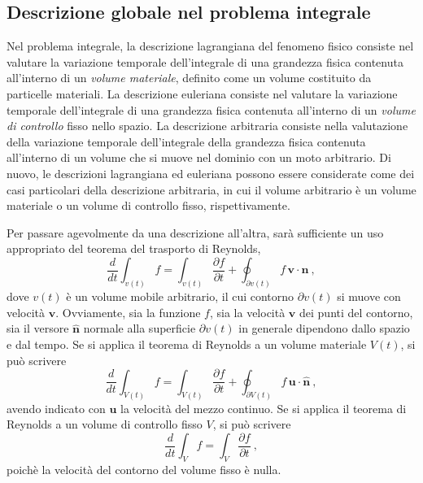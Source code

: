 \subsection{Descrizione globale nel problema integrale}
Nel problema integrale, la descrizione lagrangiana del fenomeno fisico consiste nel valutare la variazione temporale dell'integrale di una grandezza fisica contenuta all'interno di un \textit{volume materiale}, definito come un volume costituito da particelle materiali. La descrizione euleriana consiste nel valutare la variazione temporale dell'integrale di una grandezza fisica contenuta all'interno di un \textit{volume di controllo} fisso nello spazio. La descrizione arbitraria consiste nella valutazione della variazione temporale dell'integrale della grandezza fisica contenuta all'interno di un volume che si muove nel dominio con un moto arbitrario. Di nuovo, le descrizioni lagrangiana ed euleriana possono essere considerate come dei casi particolari della descrizione arbitraria, in cui il volume arbitrario è un volume materiale o un volume di controllo fisso, rispettivamente.

Per passare agevolmente da una descrizione all'altra, sarà sufficiente un uso appropriato del teorema del trasporto di Reynolds,
\begin{equation}\label{eqn:rey:volArb}
    \dfrac{d}{dt} \int_{v(t)} f = \int_{v(t)} \dfrac{\partial f}{\partial t} +
     \oint_{\partial v(t)} f \, \bm{v} \cdot \bm{\hat{n}} \ ,
\end{equation}
dove $v(t)$ è un volume mobile arbitrario, il cui contorno $\partial v(t)$ si muove con velocità $\bm{v}$. Ovviamente, sia la funzione $f$, sia la velocità $\bm{v}$ dei punti del contorno, sia il versore $\bm{\hat{n}}$ normale alla superficie $\partial v(t)$ in generale dipendono dallo spazio e dal tempo.
%
Se si applica il teorema di Reynolds a un volume materiale $V(t)$, si può scrivere
\begin{equation}\label{eqn:rey:volMat}
    \dfrac{d}{dt} \int_{V(t)} f = \int_{V(t)} \dfrac{\partial f}{\partial t} +
     \oint_{\partial V(t)} f \, \bm{u} \cdot \bm{\hat{n}} \ ,
\end{equation}
avendo indicato con $\bm{u}$ la velocità del mezzo continuo.
%
Se si applica il teorema di Reynolds a un volume di controllo fisso $V$, si può scrivere
\begin{equation}\label{eqn:rey:volCon}
    \dfrac{d}{dt} \int_{V} f = \int_{V} \dfrac{\partial f}{\partial t} \ ,
\end{equation}
poichè la velocità del contorno del volume fisso è nulla.


